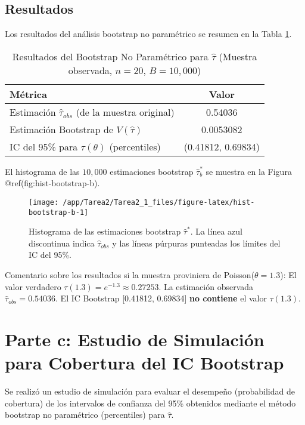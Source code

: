 \documentclass[
  11pt,
  a4paper]{article}
\begin{document}
\subsection{Resultados}

Los resultados del análisis bootstrap no paramétrico se resumen en la
Tabla \ref{tab:boot_results_b}.

\begin{table}[H]
    \centering
    \caption{Resultados del Bootstrap No Paramétrico para $\hat{\tau}$ (Muestra observada, $n=20$, $B=10,000$)}
    \label{tab:boot_results_b}
    \begin{tabular}{lc}
        \toprule
        Métrica & Valor \\
        \midrule
        Estimación $\hat{\tau}_{obs}$ (de la muestra original) & 0.54036 \\
        Estimación Bootstrap de $V(\hat{\tau})$ & 0.0053082 \\
        IC del 95\% para $\tau(\theta)$ (percentiles) & (0.41812, 0.69834) \\
        \bottomrule
    \end{tabular}
\end{table}

El histograma de las \(10,000\) estimaciones bootstrap
\(\hat{\tau}_b^*\) se muestra en la Figura @ref(fig:hist-bootstrap-b).

\begin{figure}

{\centering \texttt{[image: /app/Tarea2/Tarea2\_1\_files/figure-latex/hist-bootstrap-b-1]} 

}

\caption{Histograma de las estimaciones bootstrap $\hat{\tau}^*$. La línea azul discontinua indica $\hat{\tau}_{obs}$ y las líneas púrpuras punteadas los límites del IC del 95\%.}\label{fig:hist-bootstrap-b}
\end{figure}

Comentario sobre los resultados si la muestra proviniera de
Poisson(\(\theta=1.3\)): El valor verdadero
\(\tau(1.3) = e^{-1.3} \approx 0.27253\). La estimación observada
\(\hat{\tau}_{obs} = 0.54036\). El IC Bootstrap {[}0.41812, 0.69834{]}
\textbf{no contiene} el valor \(\tau(1.3)\).

\section{Parte c: Estudio de Simulación para Cobertura del IC Bootstrap}

Se realizó un estudio de simulación para evaluar el desempeño
(probabilidad de cobertura) de los intervalos de confianza del 95\%
obtenidos mediante el método bootstrap no paramétrico (percentiles) para
\(\hat{\tau}\).
\end{document}
